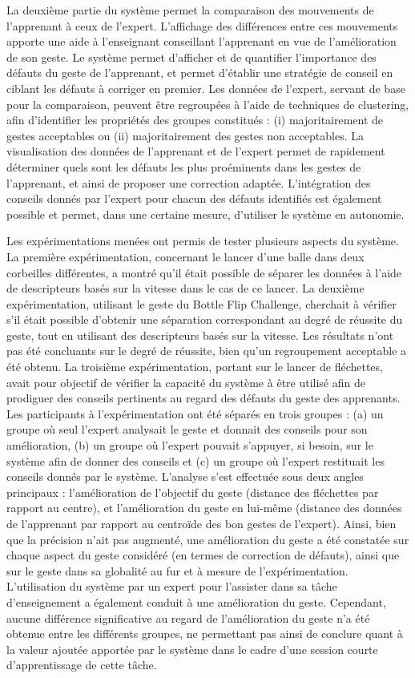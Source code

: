 La deuxième partie du système permet la comparaison des mouvements de l'apprenant à ceux de l'expert. L'affichage des différences entre ces mouvements apporte une aide à l'enseignant conseillant l'apprenant en vue de l'amélioration de son geste. Le système permet d'afficher et de quantifier l'importance des défauts du geste de l'apprenant, et permet d'établir une stratégie de conseil en ciblant les défauts à corriger en premier. Les données de l'expert, servant de base pour la comparaison, peuvent être regroupées à l'aide de techniques de clustering, afin d'identifier les propriétés des groupes constitués : (i) majoritairement de gestes acceptables ou (ii) majoritairement des gestes non acceptables. La visualisation des données de l'apprenant et de l'expert permet de rapidement déterminer quels sont les défauts les plus proéminents dans les gestes de l'apprenant, et ainsi de proposer une correction adaptée. L'intégration des conseils donnés par l'expert pour chacun des défauts identifiés est également possible et permet, dans une certaine mesure, d'utiliser le système en autonomie.

Les expérimentations menées ont permis de tester plusieurs aspects du système. La première expérimentation, concernant le lancer d'une balle dans deux corbeilles différentes, a montré qu'il était possible de séparer les données à l'aide de descripteurs basés sur la vitesse dans le cas de ce lancer. La deuxième expérimentation, utilisant le geste du Bottle Flip Challenge, cherchait à vérifier s'il était possible d'obtenir une séparation correspondant au degré de réussite du geste, tout en utilisant des descripteurs basés sur la vitesse. Les résultats n'ont pas été concluants sur le degré de réussite, bien qu'un regroupement acceptable a été obtenu. La troisième expérimentation, portant sur le lancer de fléchettes, avait pour objectif de vérifier la capacité du système à être utilisé afin de prodiguer des conseils pertinents au regard des défauts du geste des apprenants. Les participants à l'expérimentation ont été séparés en trois groupes : (a) un groupe où seul l'expert analysait le geste et donnait des conseils pour son amélioration, (b) un groupe où l'expert pouvait s'appuyer, si besoin, sur le système afin de donner des conseils et (c) un groupe où l'expert restituait les conseils donnés par le système. L'analyse s'est effectuée sous deux angles principaux : l'amélioration de l'objectif du geste (distance des fléchettes par rapport au centre), et l'amélioration du geste en lui-même (distance des données de l'apprenant par rapport au centroïde des bon gestes de l'expert). Ainsi, bien que la précision n'ait pas augmenté, une amélioration du geste a été constatée sur chaque aspect du geste considéré (en termes de correction de défauts), ainsi que sur le geste dans sa globalité au fur et à mesure de l'expérimentation. L'utilisation du système par un expert pour l'assister dans sa tâche d'enseignement a également conduit à une amélioration du geste. Cependant, aucune différence significative au regard de l'amélioration du geste n'a été obtenue entre les différents groupes, ne permettant pas ainsi de conclure quant à la valeur ajoutée apportée par le système dans le cadre d'une session courte d'apprentissage de cette tâche.

